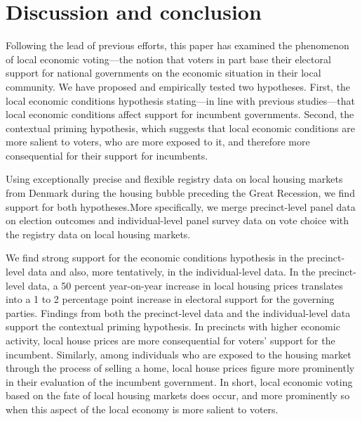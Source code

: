 \documentclass[12pt,a4paper]{article}
\begin{document}
	\section{Discussion and conclusion}
	Following  the lead of previous efforts, this paper  has examined the phenomenon of local economic voting—the notion that voters in part base their electoral support for national governments on the economic situation in their local community. We have proposed and empirically tested two hypotheses. First, the local economic conditions hypothesis stating—in line with previous studies—that local economic conditions affect support for incumbent governments. Second, the contextual priming hypothesis, which suggests that local economic conditions are more salient to voters, who are more exposed to it, and therefore more consequential for their support for incumbents. 
	
	Using exceptionally precise and flexible registry data on local housing markets from Denmark during the housing bubble preceding  the Great Recession, we find support for both hypotheses.More specifically, we merge precinct-level panel data on election outcomes and individual-level panel survey data on vote choice with the registry data on local housing markets.
	
	We find strong support for the economic conditions hypothesis in the precinct-level data and also, more tentatively, in the individual-level data. In the precinct-level data, a 50 percent year-on-year increase in local housing prices translates into a 1 to 2 percentage point increase in electoral support for the governing parties. Findings from both the precinct-level data and the individual-level data support the contextual priming hypothesis. In precincts with higher economic activity, local house prices are more consequential for voters’ support for the incumbent. Similarly, among individuals who are exposed to the housing market through the process of selling a home, local house prices figure more prominently in their evaluation of the incumbent government. In short, local economic voting based on the fate of local housing markets does occur, and more prominently so when this aspect of the local economy is more salient to voters.
	
\end{document}
